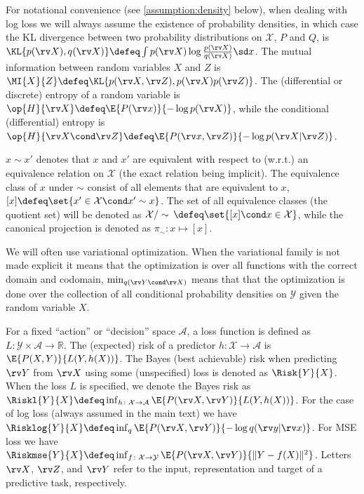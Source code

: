 \documentclass[final]{article}
\begin{document}
For notational convenience (see \cref{assumption:density}  below), when dealing with log loss we will always assume the existence of probability densities, in which case the KL divergence between two probability distributions on $\mathcal{X}$, $P$ and $Q$, is $\KL{p(\rv X), q(\rv X)} \defeq \int p(\rv X) \log  \frac{p(\rv X)}{q(\rv X)} \sd x$.
The mutual information between random variables $X$ and $Z$ is $\MI{X}{Z} \defeq \KL{{p(\rv X, \rv Z)}, p(\rv X)p(\rv Z)}$.
The (differential or discrete) entropy of a random variable is $\op{H}{\rv X} \defeq \E{P(\rv x)}{- \log p(\rv X)} $, while the conditional (differential) entropy is $\op{H}{\rv X \cond \rv Z} \defeq \E{P(\rv x,\rv Z)}{- \log p(\rv X| \rv Z)}$.




$x \sim x'$ denotes that $x$ and $x'$ are equivalent with respect to (w.r.t.) an equivalence relation on $\mathcal{X}$ (the exact relation being implicit).
The equivalence class of $x$ under $\sim$ consist of all elements that are equivalent to $x$, \ie $[x] \defeq \set{x' \in \mathcal{X} \cond x' \sim x}$.
The set of all equivalence classes (the quotient set) will be denoted as $\mathcal{X} / \sim \, \defeq \set{[x] \cond x \in \mathcal{X}}$, while the canonical projection is denoted as $\pi_{\sim} : x \mapsto [x]$.

We will often use variational optimization. When the variational family is not made explicit it means that the optimization is over all functions with the correct domain and codomain, \eg  $\min_{q(\rv Y \cond \rv X)}$ means that that the optimization is done over the collection of all conditional probability densities  on $\mathcal{Y}$ given the random variable $X$. 

For a fixed ``action'' or ``decision'' space $\mathcal{A}$, a loss function is defined as $L : \mathcal{Y} \times \mathcal{A} \to \mathbb{R}$. The (expected) risk of a predictor $h \colon \mathcal{X} \to \mathcal{A}$ is $\E{P(X,Y)}{L(Y, h(X))}$. 
The Bayes (best achievable) risk when predicting $\rv Y$ from $\rv X$ using some (unspecified) loss is denoted as $\Risk{Y}{X}$. 
When the loss $L$ is specified, we denote the Bayes risk as $\Riskl{Y}{X} \defeq \inf_{h\colon \mathcal{X} \to \mathcal{A}} \E{P(\rv X, \rv Y)}{L(Y,h(X))}$.
For the case of log loss (always assumed in the main text) we have  $\Risklog{Y}{X} \defeq \inf_{q} \E{P(\rv X, \rv Y)}{- \log q(\rv y|\rv x)}$.
For MSE loss we have $\Riskmse{Y}{X} \defeq \inf_{f \colon \mathcal{X} \to \mathcal{Y}} \E{P(\rv X, \rv Y)}{\| Y - f(X) \|^2}$.
Letters $\rv X$, $\rv Z$, and $\rv Y$ refer to the input, representation and target of a predictive task, respectively.
\end{document}
